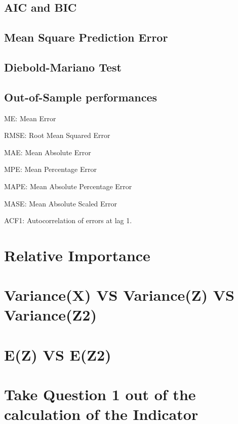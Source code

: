 \documentclass[12pt,a4paper,oneside]{book}
\begin{document}
\subsection{AIC and BIC}

\subsection{Mean Square Prediction Error}

\subsection{Diebold-Mariano Test}



\subsection{Out-of-Sample performances}


ME: Mean Error

RMSE: Root Mean Squared Error

MAE: Mean Absolute Error

MPE: Mean Percentage Error

MAPE: Mean Absolute Percentage Error

MASE: Mean Absolute Scaled Error

ACF1: Autocorrelation of errors at lag 1.

\section{Relative Importance}







\section{Variance(X) VS Variance(Z) VS Variance(Z2)}

\section{E(Z) VS E(Z2)}


\section{Take Question 1 out of the calculation of the Indicator}
\end{document}
